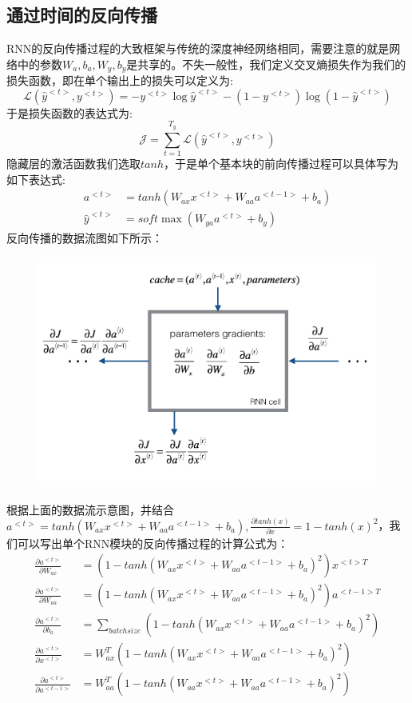 \documentclass{ctexart}
\begin{document}
\subsection{通过时间的反向传播}
RNN的反向传播过程的大致框架与传统的深度神经网络相同，需要注意的就是网络中的参数$W_a,b_a,W_y,b_y$是共享的。不失一般性，我们定义交叉熵损失作为我们的损失函数，即在单个输出上的损失可以定义为:
\begin{equation*}
\mathcal{L}{(\hat{y}^{<t>},y^{<t>})} = -y^{<t>}\log{\hat{y}^{<t>}}- (1-y^{<t>})\log{(1-\hat{y}^{<t>})}
\end{equation*}
于是损失函数的表达式为:
\begin{equation*}
\mathcal{J} = \sum_{t=1}^{T_y}\mathcal{L}{\left(\hat{y}^{<t>},y^{<t>}\right)}
\end{equation*}
隐藏层的激活函数我们选取$tanh$，于是单个基本块的前向传播过程可以具体写为如下表达式:
\begin{align*}
a^{<t>} &= tanh(W_{ax}x^{<t>}+W_{aa}a^{<t-1>}+b_a)\\
\hat{y}^{<t>} &= soft\max(W_{ya}a^{<t>}+b_y)
\end{align*}
反向传播的数据流图如下所示：
\begin{figure}[htb!]
	\centering
	\includegraphics[scale=0.55]{rnn_cell_backprop.png}
\end{figure}


根据上面的数据流示意图，并结合$a^{<t>} = tanh(W_{ax}x^{<t>}+W_{aa}a^{<t-1>}+b_a),\frac{\partial{tanh(x)}}{\partial{x}}=1-tanh(x)^2$，我们可以写出单个RNN模块的反向传播过程的计算公式为：
\begin{align*}
\frac{\partial a^{<t>}}{\partial W_{ax}} &= (1-tanh(W_{ax}x^{<t>}+W_{aa}a^{<t-1>}+b_a)^2)x^{<t>T}\\
\frac{\partial a^{<t>}}{\partial W_{aa}} &= (1-tanh(W_{ax}x^{<t>}+W_{aa}a^{<t-1>}+b_a)^2)a^{<t-1>T}\\
\frac{\partial a^{<t>}}{\partial b_a} &= \sum_{batchsize}(1-tanh(W_{ax}x^{<t>}+W_{aa}a^{<t-1>}+b_a)^2)\\
\frac{\partial{a}^{<t>}}{\partial{x}^{<t>}} &= W_{ax}^T(1-tanh(W_{ax}x^{<t>}+W_{aa}a^{<t-1>}+b_a)^2)\\
\frac{\partial{a}^{<t>}}{\partial{a}^{<t-1>}} &= W_{aa}^T(1-tanh(W_{aa}x^{<t>}+W_{aa}a^{<t-1>}+b_a)^2)
\end{align*}
\end{document}
